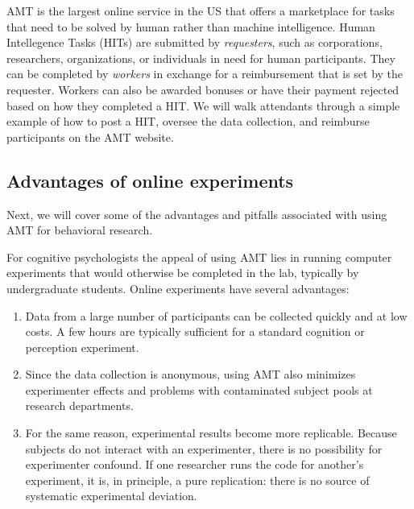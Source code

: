 \documentclass[10pt,letterpaper]{article}
\begin{document}
AMT is the largest online service in the US that offers a marketplace for tasks
that need to be solved by human rather than machine intelligence. Human
Intellegence Tasks (HITs) are submitted by \emph{requesters}, such as
corporations, researchers, organizations, or individuals in need for human
participants.  They can be completed by \emph{workers} in exchange for a
reimbursement that is set by the requester. Workers can also be awarded bonuses
or have their payment rejected based on how they completed a {HIT}. We will walk
attendants through a simple example of how to post a HIT, oversee the data
collection, and reimburse participants on the AMT website.


\subsection{Advantages of online experiments}
Next, we will cover some of the advantages and pitfalls associated with using AMT
for behavioral research.

For cognitive psychologists the appeal of using AMT lies in running computer
experiments that would otherwise be completed in the lab, typically by
undergraduate students. Online experiments have several advantages:
\begin{enumerate}
\item
    Data from a large number of participants can be collected  quickly and at low
    costs.  A few hours are typically sufficient for a standard cognition or
    perception experiment.
\item
    Since the data collection is anonymous, using AMT also minimizes experimenter
    effects and problems with contaminated subject pools at research departments.
\item 
    For the same reason, experimental results become more replicable. Because
    subjects do not interact with an experimenter, there is no possibility for
    experimenter confound. If one researcher runs the code for another's
    experiment, it is, in principle, a pure replication: there is no source of
    systematic experimental deviation.
\end{enumerate}
\end{document}
